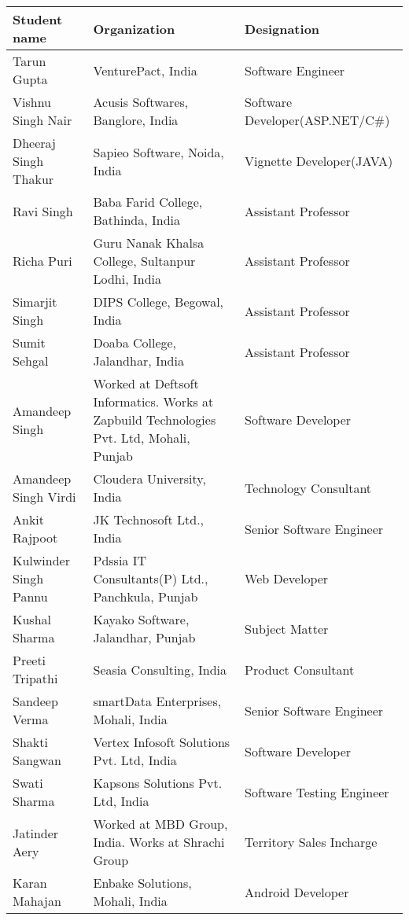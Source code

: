 \documentclass[margin,line]{res}
\begin{document}
\begin{resume}
\begin{center}
    \begin{tabular}{ | p{3cm} | p{5cm} | l | }
    \hline
    \textbf{Student name} & \textbf{Organization} & \textbf{Designation}\\
    \hline
    Tarun Gupta & VenturePact, India & Software Engineer\\
    \hline
    Vishnu Singh Nair & Acusis Softwares, Banglore, India & Software Developer(ASP.NET/C\#)\\
    \hline
    Dheeraj Singh Thakur & Sapieo Software, Noida, India & Vignette Developer(JAVA)\\
    \hline
    Ravi Singh & Baba Farid College, Bathinda, India & Assistant Professor\\
    \hline
    Richa Puri & Guru Nanak Khalsa College, Sultanpur Lodhi, India & Assistant Professor\\
    \hline
	Simarjit Singh & DIPS College, Begowal, India & Assistant Professor\\
    \hline
    Sumit Sehgal & Doaba College, Jalandhar, India & Assistant Professor\\
    \hline
    Amandeep Singh & Worked at Deftsoft Informatics. Works at Zapbuild Technologies Pvt. Ltd, Mohali, Punjab & Software Developer\\
    \hline
    Amandeep Singh Virdi & Cloudera University, India & Technology Consultant\\
    \hline
    Ankit Rajpoot & JK Technosoft Ltd., India & Senior Software Engineer\\
    \hline
    Kulwinder Singh Pannu & Pdssia IT Consultants(P) Ltd., Panchkula, Punjab & Web Developer\\
    \hline
    Kushal Sharma & Kayako Software, Jalandhar, Punjab & Subject Matter\\
    \hline
    Preeti Tripathi & Seasia Consulting, India & Product Consultant\\
    \hline
    Sandeep Verma & smartData Enterprises, Mohali, India & Senior Software Engineer\\
    \hline
    Shakti Sangwan & Vertex Infosoft Solutions Pvt. Ltd, India & Software Developer\\
    \hline
	Swati Sharma & Kapsons Solutions Pvt. Ltd, India & Software Testing Engineer\\
    \hline    
    Jatinder Aery & Worked at MBD Group, India. Works at Shrachi Group & Territory Sales Incharge\\
    \hline    
    Karan Mahajan & Enbake Solutions, Mohali, India & Android Developer\\

\end{tabular}
\end{center}
\end{resume}
\end{document}
